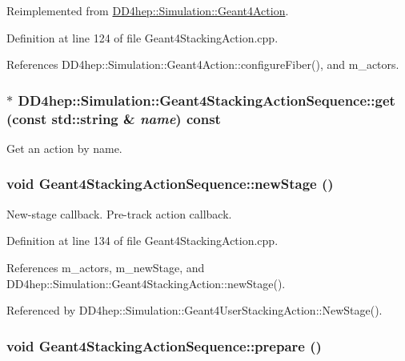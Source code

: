 Reimplemented from \hyperlink{class_d_d4hep_1_1_simulation_1_1_geant4_action_a6adc7138508303e4e417cb48a737ab19}{DD4hep::Simulation::Geant4Action}.

Definition at line 124 of file Geant4StackingAction.cpp.

References DD4hep::Simulation::Geant4Action::configureFiber(), and m\_\-actors.\hypertarget{class_d_d4hep_1_1_simulation_1_1_geant4_stacking_action_sequence_a1f5acccf1180d7c6a6ff9c919bd96384}{
\subsubsection[{get}]{$\ast$ DD4hep::Simulation::Geant4StackingActionSequence::get (const std::string \& {\em name}) const}}
\label{class_d_d4hep_1_1_simulation_1_1_geant4_stacking_action_sequence_a1f5acccf1180d7c6a6ff9c919bd96384}


Get an action by name. \hypertarget{class_d_d4hep_1_1_simulation_1_1_geant4_stacking_action_sequence_a8077fe558cebbeeef5af0114abab6a55}{
\subsubsection[{newStage}]{\setlength{\rightskip}{0pt plus 5cm}void Geant4StackingActionSequence::newStage ()}}
\label{class_d_d4hep_1_1_simulation_1_1_geant4_stacking_action_sequence_a8077fe558cebbeeef5af0114abab6a55}


New-\/stage callback. Pre-\/track action callback. 

Definition at line 134 of file Geant4StackingAction.cpp.

References m\_\-actors, m\_\-newStage, and DD4hep::Simulation::Geant4StackingAction::newStage().

Referenced by DD4hep::Simulation::Geant4UserStackingAction::NewStage().\hypertarget{class_d_d4hep_1_1_simulation_1_1_geant4_stacking_action_sequence_a77ab67508d46a2af265090b04d5a41cb}{
\subsubsection[{prepare}]{\setlength{\rightskip}{0pt plus 5cm}void Geant4StackingActionSequence::prepare ()}}
\label{class_d_d4hep_1_1_simulation_1_1_geant4_stacking_action_sequence_a77ab67508d46a2af265090b04d5a41cb}


